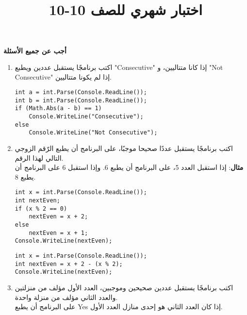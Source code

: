 \documentclass[12pt]{article}
\title{اختبار شهري للصف 10-10}
\begin{document}
\maketitle
\thispagestyle{fancy}

\textbf{أجب عن جميع الأسئلة}

\begin{enumerate}[itemsep=2em]

\item
اكتب برنامجًا يستقبل عددين ويطبع \textenglish{"Consecutive"} إذا كانا متتاليين، و \textenglish{"Not Consecutive"} إذا لم يكونا متتاليين.

\ifwithsols
\begin{boxSolution}
\begin{english}
\begin{verbatim}
int a = int.Parse(Console.ReadLine());
int b = int.Parse(Console.ReadLine());
if (Math.Abs(a - b) == 1)
    Console.WriteLine("Consecutive");
else
    Console.WriteLine("Not Consecutive");
\end{verbatim}
\end{english}
\end{boxSolution}
\fi

\item
اكتب برنامجًا يستقبل عددًا صحيحا موجبًا، على البرنامج أن يطبع الرّقم الزوجي التالي لهذا الرقم.\\
\textbf{مثال}: إذا استقبل العدد 5، على البرنامج أن يطبع 6. وإذا استقبل 6 على البرنامج أن يطبع 8.

\ifwithsols
\begin{boxSolution}[1]
\begin{english}
\begin{verbatim}
int x = int.Parse(Console.ReadLine());
int nextEven;
if (x % 2 == 0)
    nextEven = x + 2;
else
    nextEven = x + 1;
Console.WriteLine(nextEven);
\end{verbatim}
\end{english}
\end{boxSolution}
\begin{boxSolution}[2]
\begin{english}
\begin{verbatim}
int x = int.Parse(Console.ReadLine());
int nextEven = x + 2 - (x % 2);
Console.WriteLine(nextEven);
\end{verbatim}
\end{english}
\end{boxSolution}
\fi

\item
اكتب برنامجًا يستقبل عددين صحيحين وموجبين، العدد الأول مؤلف من منزلتين والعدد الثاني مؤلف من منزلة واحدة. \\
على البرنامج أن يطبع \textenglish{Yes} إذا كان العدد الثاني هو إحدى منازل العدد الأول.


\end{enumerate}
\end{document}

